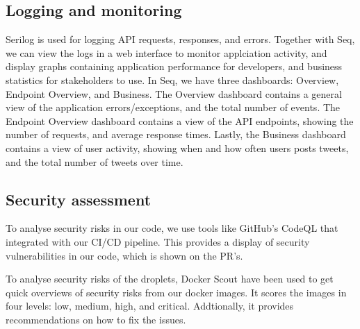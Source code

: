 \subsection{Logging and monitoring}
Serilog is used for logging API requests, responses, and errors.
Together with Seq, we can view the logs in a web interface to monitor 
applciation activity, and display graphs containing application performance 
for developers, and business statistics for stakeholders to use.
In Seq, we have three dashboards: Overview, Endpoint Overview, and Business.
The Overview dashboard contains a general view of the application 
errors/exceptions, and the total number of events.
The Endpoint Overview dashboard contains a view of the API endpoints,
showing the number of requests, and average response times.
Lastly, the Business dashboard contains a view of user activity,
showing when and how often users posts tweets, and the total number of tweets over time.


\subsection{Security assessment}
To analyse security risks in our code, we use tools like GitHub's CodeQL\cite{codeql} that 
integrated with our CI/CD pipeline.
This provides a display of security vulnerabilities in our code,
which is shown on the PR's.

To analyse security risks of the droplets, Docker Scout have been used to get
quick overviews of security risks from our docker images.
It scores the images in four levels: low, medium, high, and critical.
Addtionally, it provides recommendations on how to fix the issues.


